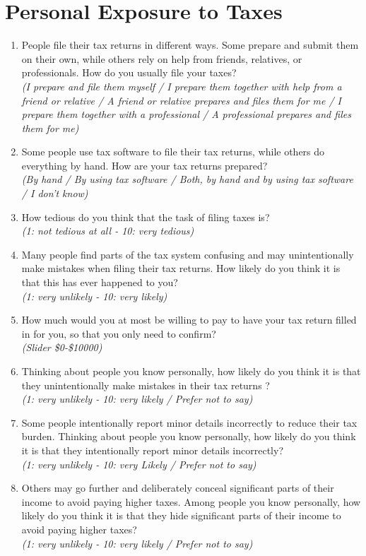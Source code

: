 \documentclass[11pt]{article}
\begin{document}
\section*{Personal Exposure to Taxes}
\begin{enumerate}[resume]
    \item People file their tax returns in different ways. Some prepare and submit them on their own, while others rely on help from friends, relatives, or professionals. How do you usually file your taxes?\\ 
    \textit{(I prepare and file them myself / I prepare them together with help from a friend or relative /  A friend or relative prepares and files them for me / I prepare them together with a professional / A professional prepares and files them for me)}
    \item Some people use tax software to file their tax returns, while others do everything by hand. How are your tax returns prepared? \\ 
    \textit{(By hand / By using tax software / Both, by hand and by using tax software / I don't know)}
    \item How tedious do you think that the task of filing taxes is? \\ \textit{(1: not tedious at all - 10: very tedious)}
    \item Many people find parts of the tax system confusing and may unintentionally make mistakes when filing their tax returns. How likely do you think it is that this has ever happened to you?\\
    \textit{(1: very unlikely - 10: very likely) }
    \item How much would you at most be willing to pay to have your tax return filled in for you, so that you only need to confirm? \\
    \textit{(Slider \$0-\$10000)}
    \item Thinking about people you know personally, how likely do you think it is that they unintentionally make mistakes in their tax returns ? \\
    \textit{(1: very unlikely - 10: very likely / Prefer not to say)}
    \item Some people intentionally report minor details incorrectly to reduce their tax burden. Thinking about people you know personally, how likely do you think it is that they intentionally report minor details incorrectly?\\
    \textit{(1: very unlikely - 10: very Likely / Prefer not to say)}
    \item Others may go further and deliberately conceal significant parts of their income to avoid paying higher taxes. Among people you know personally, how likely do you think it is that they hide significant parts of their income to avoid paying higher taxes?\\
    \textit{(1: very unlikely - 10: very likely / Prefer not to say)}
\end{enumerate}
\end{document}
